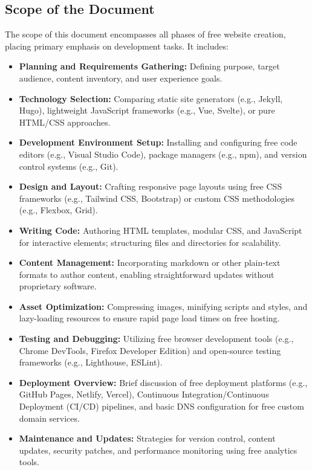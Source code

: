 \subsection{Scope of the Document}

The scope of this document encompasses all phases of free website creation, placing primary emphasis on development tasks. It includes:

\begin{itemize}
    \item \textbf{Planning and Requirements Gathering:} Defining purpose, target audience, content inventory, and user experience goals.
    \item \textbf{Technology Selection:} Comparing static site generators (e.g., Jekyll, Hugo), lightweight JavaScript frameworks (e.g., Vue, Svelte), or pure HTML/CSS approaches.
    \item \textbf{Development Environment Setup:} Installing and configuring free code editors (e.g., Visual Studio Code), package managers (e.g., npm), and version control systems (e.g., Git).
    \item \textbf{Design and Layout:} Crafting responsive page layouts using free CSS frameworks (e.g., Tailwind CSS, Bootstrap) or custom CSS methodologies (e.g., Flexbox, Grid).
    \item \textbf{Writing Code:} Authoring HTML templates, modular CSS, and JavaScript for interactive elements; structuring files and directories for scalability.
    \item \textbf{Content Management:} Incorporating markdown or other plain-text formats to author content, enabling straightforward updates without proprietary software.
    \item \textbf{Asset Optimization:} Compressing images, minifying scripts and styles, and lazy-loading resources to ensure rapid page load times on free hosting.
    \item \textbf{Testing and Debugging:} Utilizing free browser development tools (e.g., Chrome DevTools, Firefox Developer Edition) and open-source testing frameworks (e.g., Lighthouse, ESLint).
    \item \textbf{Deployment Overview:} Brief discussion of free deployment platforms (e.g., GitHub Pages, Netlify, Vercel), Continuous Integration/Continuous Deployment (CI/CD) pipelines, and basic DNS configuration for free custom domain services.
    \item \textbf{Maintenance and Updates:} Strategies for version control, content updates, security patches, and performance monitoring using free analytics tools.

\end{itemize}
